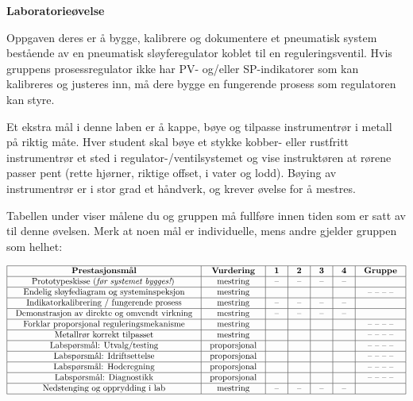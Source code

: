 

\noindent
{\bf Laboratorieøvelse}

\vskip 5pt

Oppgaven deres er å bygge, kalibrere og dokumentere et pneumatisk system bestående av en pneumatisk sløyferegulator koblet til en reguleringsventil. Hvis gruppens prosessregulator ikke har PV- og/eller SP-indikatorer som kan kalibreres og justeres inn, må dere bygge en fungerende prosess som regulatoren kan styre.

Et ekstra mål i denne laben er å kappe, bøye og tilpasse instrumentrør i metall på riktig måte. Hver student skal bøye et stykke kobber- eller rustfritt instrumentrør et sted i regulator-/ventilsystemet og vise instruktøren at rørene passer pent (rette hjørner, riktige offset, i vater og lodd). Bøying av instrumentrør er i stor grad et håndverk, og krever øvelse for å mestres.

Tabellen under viser målene du og gruppen må fullføre innen tiden som er satt av til denne øvelsen. Merk at noen mål er individuelle, mens andre gjelder gruppen som helhet:



$$\vbox{\offinterlineskip
\halign{\strut
\vrule \quad\hfil # \ \hfil & 
\vrule \quad\hfil # \ \hfil & 
\vrule \quad\hfil # \ \hfil & 
\vrule \quad\hfil # \ \hfil & 
\vrule \quad\hfil # \ \hfil & 
\vrule \quad\hfil # \ \hfil & 
\vrule \quad\hfil # \ \hfil \vrule \cr
\noalign{\hrule}
%
{\bf Prestasjonsmål} & {\bf Vurdering} & {\bf 1} & {\bf 2} & {\bf 3} & {\bf 4} & {\bf Gruppe} \cr
%
\noalign{\hrule}
%
Prototypeskisse ({\it før systemet bygges!}) & mestring & -- & -- & -- & -- & \cr
%
\noalign{\hrule}
%
Endelig sløyfediagram og systeminspeksjon & mestring & & & & & -- -- -- -- \cr
%
\noalign{\hrule}
%
Indikatorkalibrering / fungerende prosess & mestring & -- & -- & -- & -- &  \cr
%
\noalign{\hrule}
%
Demonstrasjon av direkte og omvendt virkning & mestring & -- & -- & -- & -- &  \cr
%
\noalign{\hrule}
%
Forklar proporsjonal reguleringsmekanisme & mestring & & & & & -- -- -- -- \cr
%
\noalign{\hrule}
%
Metallrør korrekt tilpasset & mestring & & & & & -- -- -- -- \cr
%
\noalign{\hrule}
%
Labspørsmål: Utvalg/testing & proporsjonal &  &  &  &  & -- -- -- -- \cr
%
\noalign{\hrule}
%
Labspørsmål: Idriftsettelse & proporsjonal &  &  &  &  & -- -- -- -- \cr
%
\noalign{\hrule}
%
Labspørsmål: Hoderegning & proporsjonal &  &  &  &  & -- -- -- -- \cr
%
\noalign{\hrule}
%
Labspørsmål: Diagnostikk & proporsjonal &  &  &  &  & -- -- -- -- \cr
%
\noalign{\hrule}
%
Nedstenging og opprydding i lab & mestring & -- & -- & -- & -- &  \cr
%
\noalign{\hrule}
} %
}$$ %

